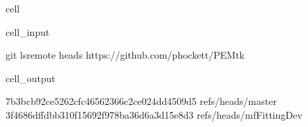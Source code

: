 \documentclass[letterpaper,table,10pt,english]{jupyterBook}
\begin{document}
\begin{sphinxuseclass}{cell}\begin{sphinxVerbatimInput}

\begin{sphinxuseclass}{cell_input}
\begin{sphinxVerbatim}[commandchars=\\\{\}]
git ls\PYGZhy{}remote \PYGZhy{}\PYGZhy{}heads https://github.com/phockett/PEMtk
\end{sphinxVerbatim}

\end{sphinxuseclass}\end{sphinxVerbatimInput}
\begin{sphinxVerbatimOutput}

\begin{sphinxuseclass}{cell_output}
\begin{sphinxVerbatim}[commandchars=\\\{\}]
7b3bcb92ce5262cfc46562366c2ce024dd4509d5	refs/heads/master
3f4686dffdbb310f15692f978ba36d6a3d15e8d3	refs/heads/mfFittingDev
\end{sphinxVerbatim}

\end{sphinxuseclass}\end{sphinxVerbatimOutput}

\end{sphinxuseclass}
\end{document}
